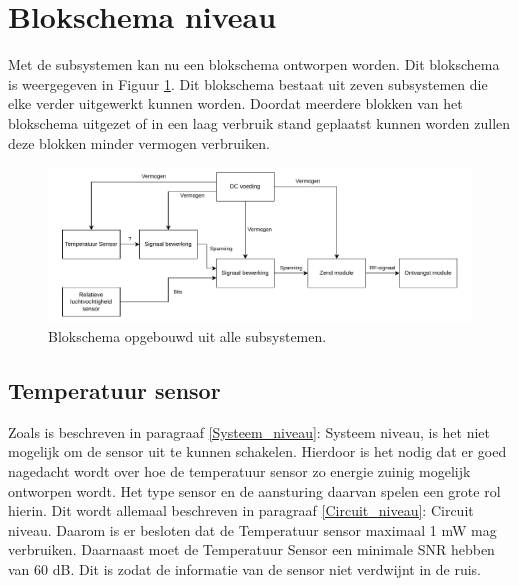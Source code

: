 \newpage
\section{Blokschema niveau}
\label{Block_schema}
Met de subsystemen kan nu een blokschema ontworpen worden. Dit blokschema is weergegeven in Figuur \ref{fig:Blok_schema_1_top_level}. Dit blokschema bestaat uit zeven subsystemen die elke verder uitgewerkt kunnen worden. Doordat meerdere blokken van het blokschema uitgezet of in een laag verbruik stand geplaatst kunnen worden zullen deze blokken minder vermogen verbruiken.

\begin{figure}[H]
    \centering
    \includegraphics[width=0.85\linewidth]{pictures/Blok_schema_systeem_ontwerp_1.drawio.pdf}
    \caption{Blokschema opgebouwd uit alle subsystemen.}
    \label{fig:Blok_schema_1_top_level}
\end{figure}

\subsection{Temperatuur sensor}
Zoals is beschreven in paragraaf \ref{Systeem_niveau}: Systeem niveau, is het niet mogelijk om de sensor uit te kunnen schakelen. Hierdoor is het nodig dat er goed nagedacht wordt over hoe de temperatuur sensor zo energie zuinig mogelijk ontworpen wordt. Het type sensor en de aansturing daarvan spelen een grote rol hierin. Dit wordt allemaal beschreven in paragraaf \ref{Circuit_niveau}: Circuit niveau. Daarom is er besloten dat de Temperatuur sensor maximaal 1 mW mag verbruiken. Daarnaast moet de Temperatuur Sensor een minimale SNR hebben van 60 dB. Dit is zodat de informatie van de sensor niet verdwijnt in de ruis.

